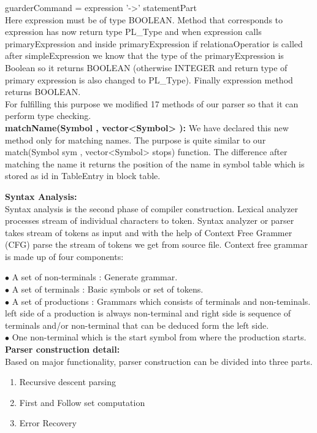 \documentclass[paper=letter, fontsize=12pt]{scrartcl} %
\begin{document}
guarderCommand = expression '->' statementPart\\

Here expression must be of type BOOLEAN. Method that corresponds to expression has now return type PL\_Type and when expression calls primaryExpression and inside primaryExpression if relationaOperatior is called after simpleExpression we know that the type of the primaryExpression is Boolean so it returns BOOLEAN (otherwise INTEGER and return type of primary expression is also changed to PL\_Type). Finally expression method returns BOOLEAN. \\
For fulfilling this purpose we modified 17 methods of our parser so that it can perform type checking.\\

{\bf matchName(Symbol , vector<Symbol> ):}
We have declared this new method only for matching names. The purpose is quite similar to our match(Symbol sym , vector<Symbol> stops) function. The difference after matching the name it returns the position of the name in symbol table which is stored as id in TableEntry in block table.           

\pagebreak

{\bf {\huge Syntax Analysis:}}\\
Syntax analysis is the second phase of compiler construction. Lexical analyzer processes stream of individual characters to token. Syntax analyzer or parser takes stream of tokens as input and with the help of Context Free Grammer (CFG) parse the stream of tokens we get from source file. Context free grammar is made up of four components:

$\bullet$ A set of non-terminals : Generate grammar.\\
$\bullet$ A set of terminals : Basic symbols or set of tokens.\\
$\bullet$ A set of productions : Grammars which consists of terminals and non-teminals. left side of a production is always non-terminal and right side is sequence of terminals and/or non-terminal that can be deduced form the left side.\\
$\bullet$ One non-terminal which is the start symbol from where the production starts.\\


{\bf Parser construction detail:}\\

Based on major functionality, parser construction can be divided into three parts.
\begin{enumerate}  
\item Recursive descent parsing 
\item First and Follow set computation
\item Error Recovery
\end{enumerate}
\end{document}
